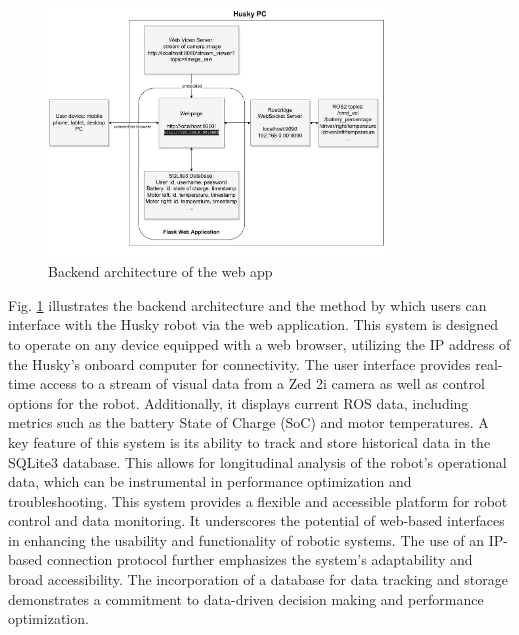 \documentclass[conference]{IEEEtran}
\begin{document}
\begin{figure}[htbp]
    \centerline{\includegraphics[width=8.9cm]{Pictures/userapp.pdf}}
    \caption{Backend architecture of the web app}
    \label{fig:userapp}
\end{figure}
Fig. \ref{fig:userapp} illustrates the backend architecture and the method by which users can interface with the Husky robot via the web application. This system is designed to operate on any device equipped with a web browser, utilizing the IP address of the Husky's onboard computer for connectivity.
The user interface provides real-time access to a stream of visual data from a Zed 2i camera as well as control options for the robot. Additionally, it displays current ROS data, including metrics such as the battery State of Charge (SoC) and motor temperatures.
A key feature of this system is its ability to track and store historical data in the SQLite3 database. This allows for longitudinal analysis of the robot's operational data, which can be instrumental in performance optimization and troubleshooting.
This system provides a flexible and accessible platform for robot control and data monitoring. It underscores the potential of web-based interfaces in enhancing the usability and functionality of robotic systems. 
The use of an IP-based connection protocol further emphasizes the system's adaptability and broad accessibility. The incorporation of a database for data tracking and storage demonstrates a commitment to data-driven decision making and performance optimization. 
\end{document}

